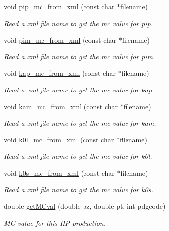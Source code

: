 \begin{DoxyCompactItemize}
\item 
void \hyperlink{class_neutrino_flux_reweight_1_1_m_i_p_p_numi_m_c_a17c0948e1735f75a21930a8b6a169355}{pip\-\_\-mc\-\_\-from\-\_\-xml} (const char $\ast$filename)
\begin{DoxyCompactList}\small\item\em Read a xml file name to get the mc value for pip. \end{DoxyCompactList}\item 
void \hyperlink{class_neutrino_flux_reweight_1_1_m_i_p_p_numi_m_c_adffa05eb58c6dfe5dabe70623699f28e}{pim\-\_\-mc\-\_\-from\-\_\-xml} (const char $\ast$filename)
\begin{DoxyCompactList}\small\item\em Read a xml file name to get the mc value for pim. \end{DoxyCompactList}\item 
void \hyperlink{class_neutrino_flux_reweight_1_1_m_i_p_p_numi_m_c_acda1139f774b6f217e5e1eb1c8b6f80c}{kap\-\_\-mc\-\_\-from\-\_\-xml} (const char $\ast$filename)
\begin{DoxyCompactList}\small\item\em Read a xml file name to get the mc value for kap. \end{DoxyCompactList}\item 
void \hyperlink{class_neutrino_flux_reweight_1_1_m_i_p_p_numi_m_c_ace99dd8837cd3aaaf4675b2b9226d440}{kam\-\_\-mc\-\_\-from\-\_\-xml} (const char $\ast$filename)
\begin{DoxyCompactList}\small\item\em Read a xml file name to get the mc value for kam. \end{DoxyCompactList}\item 
void \hyperlink{class_neutrino_flux_reweight_1_1_m_i_p_p_numi_m_c_a662127f481e524e1d4b57c8e669fdebc}{k0l\-\_\-mc\-\_\-from\-\_\-xml} (const char $\ast$filename)
\begin{DoxyCompactList}\small\item\em Read a xml file name to get the mc value for k0l. \end{DoxyCompactList}\item 
void \hyperlink{class_neutrino_flux_reweight_1_1_m_i_p_p_numi_m_c_af0d1023374ba78e3e7dba28153f00c5d}{k0s\-\_\-mc\-\_\-from\-\_\-xml} (const char $\ast$filename)
\begin{DoxyCompactList}\small\item\em Read a xml file name to get the mc value for k0s. \end{DoxyCompactList}\item 
double \hyperlink{class_neutrino_flux_reweight_1_1_m_i_p_p_numi_m_c_a28d2f7ed2ba54d12366a500a2f5715d5}{get\-M\-Cval} (double pz, double pt, int pdgcode)
\begin{DoxyCompactList}\small\item\em M\-C value for this H\-P production. \end{DoxyCompactList}\end{DoxyCompactItemize}
